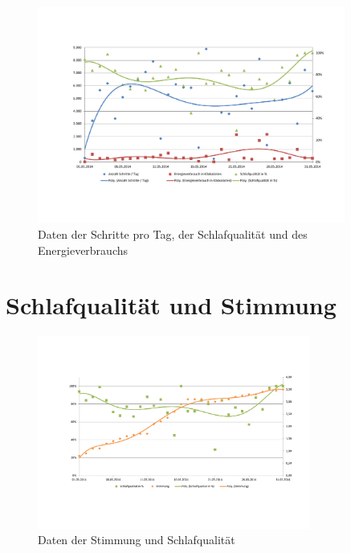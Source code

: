 \begin{figure}[H]
\centering
        \includegraphics[angle=270,width=0.9\textwidth]{images/Analyse/Sleep-Steps-kcal} 
        \caption[Daten der Schritte pro Tag, der Schlafqualität und des Energieverbrauchs]{Daten der Schritte pro Tag, der Schlafqualität und des Energieverbrauchs}
        \label{fig:SchritteSchlafqualitätUndEnergieverbrauch}
\end{figure}


\section{Schlafqualität und Stimmung}
\label{ch:AnalyseUndEvaluierung:sec:SchlafqualitätUndStimmung}

\begin{figure}[H]
\centering
        \includegraphics[angle=270,width=0.8\textwidth]{images/Analyse/Sleep-Mood} 
        \caption[Daten der Stimmung und Schlafqualität]{Daten der Stimmung und Schlafqualität}
        \label{fig:SchlafqualitätUndStimmung}
\end{figure}


